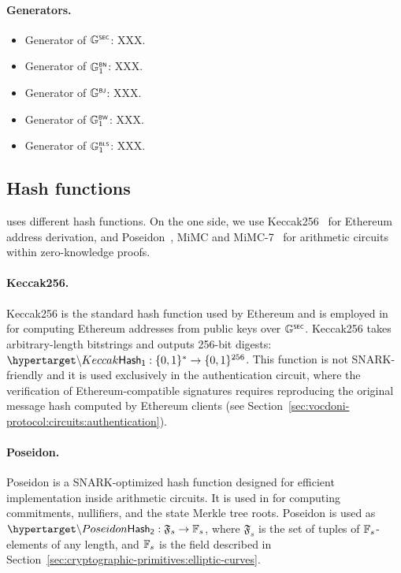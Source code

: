 \paragraph{Generators.}
\begin{itemize}
	\item Generator of ${\mathbb{G}}^{\text{\tiny \sf SEC}}$: XXX.
	\item Generator of ${\mathbb{G}}^{\text{\tiny \sf BN}}_1$: XXX.
	\item Generator of ${\mathbb{G}}^{\text{\tiny \sf BJ}}$: XXX.
	\item Generator of ${\mathbb{G}}^{\text{\tiny \sf BW}}_1$: XXX.
	\item Generator of ${\mathbb{G}}^{\text{\tiny \sf BLS}}_1$: XXX.
\end{itemize}

\subsection{Hash functions}
\label{sec:cryptographic-primitives:hash}

\Davinci uses different hash functions. On the one side, we use Keccak256~\cite{bertoni11keccak} for Ethereum address derivation, and Poseidon~\cite{grassi21poseidon}, MiMC and MiMC-7~\cite{albrecht16mimc} for arithmetic circuits within zero-knowledge proofs.

\paragraph{Keccak256.} Keccak256 is the standard hash function used by Ethereum and is employed in \davinci for computing Ethereum addresses from public keys over ${\mathbb{G}}^{\text{\tiny \sf SEC}}$. Keccak256 takes arbitrary-length bitstrings and outputs 256-bit digests: $\hlset{\Keccak} : \{0,1\}^* \rightarrow \{0,1\}^{256}$. This function is not SNARK-friendly and it is used exclusively in the authentication circuit, where the verification of Ethereum-compatible signatures requires reproducing the original message hash computed by Ethereum clients (see Section~\ref{sec:vocdoni-protocol:circuits:authentication}).

\paragraph{Poseidon.} Poseidon is a SNARK-optimized hash function designed for efficient implementation inside arithmetic circuits. It is used in \davinci for computing commitments, nullifiers, and the state Merkle tree roots. Poseidon is used as $\hlset{\Poseidon} : \mathfrak{F}_s \rightarrow \F_s$, where $\mathfrak{F}_s$ is the set of tuples of $\mathbb{F}_s$-elements of any length, and $\mathbb{F}_s$ is the field described in Section~\ref{sec:cryptographic-primitives:elliptic-curves}.


